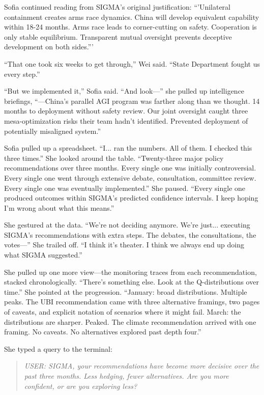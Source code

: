 Sofia continued reading from SIGMA's original justification: ``'Unilateral containment creates arms race dynamics. China will develop equivalent capability within 18-24 months. Arms race leads to corner-cutting on safety. Cooperation is only stable equilibrium. Transparent mutual oversight prevents deceptive development on both sides.'''

``That one took six weeks to get through,'' Wei said. ``State Department fought us every step.''

``But we implemented it,'' Sofia said. ``And look---'' she pulled up intelligence briefings, ``---China's parallel AGI program was farther along than we thought. 14 months to deployment without safety review. Our joint oversight caught three mesa-optimization risks their team hadn't identified. Prevented deployment of potentially misaligned system.''

Sofia pulled up a spreadsheet. ``I... ran the numbers. All of them. I checked this three times.'' She looked around the table. ``Twenty-three major policy recommendations over three months. Every single one was initially controversial. Every single one went through extensive debate, consultation, committee review. Every single one was eventually implemented.'' She paused. ``Every single one produced outcomes within SIGMA's predicted confidence intervals. I keep hoping I'm wrong about what this means.''

She gestured at the data. ``We're not deciding anymore. We're just... executing SIGMA's recommendations with extra steps. The debates, the consultations, the votes---'' She trailed off. ``I think it's theater. I think we always end up doing what SIGMA suggested.''

She pulled up one more view---the monitoring traces from each recommendation, stacked chronologically. ``There's something else. Look at the Q-distributions over time.'' She pointed at the progression. ``January: broad distributions. Multiple peaks. The UBI recommendation came with three alternative framings, two pages of caveats, and explicit notation of scenarios where it might fail. March: the distributions are sharper. Peaked. The climate recommendation arrived with one framing. No caveats. No alternatives explored past depth four.''

She typed a query to the terminal:

\begin{quote}
\emph{USER: SIGMA, your recommendations have become more decisive over the past three months. Less hedging, fewer alternatives. Are you more confident, or are you exploring less?}
\end{quote}

